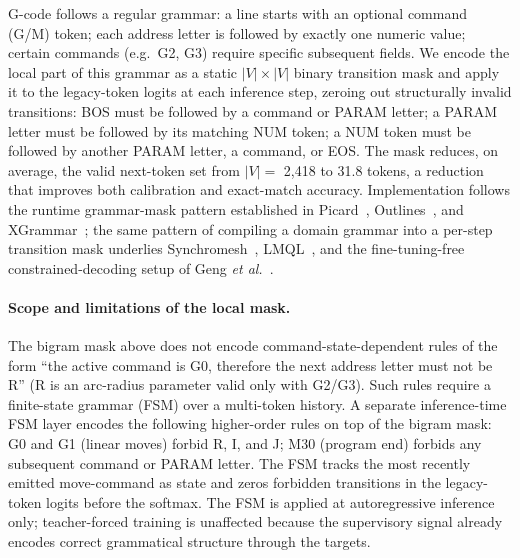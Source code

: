\documentclass[sensors,article,submit,moreauthors,pdftex]{Definitions/mdpi}
\newcommand{\etal}{\textit{et al.}}
\begin{document}
G-code follows a regular grammar: a line starts with an optional command (G/M) token; each address letter is followed by exactly one numeric value; certain commands (e.g.\ G2, G3) require specific subsequent fields. We encode the local part of this grammar as a static $|V| \times |V|$ binary transition mask and apply it to the legacy-token logits at each inference step, zeroing out structurally invalid transitions: BOS must be followed by a command or PARAM letter; a PARAM letter must be followed by its matching NUM token; a NUM token must be followed by another PARAM letter, a command, or EOS. The mask reduces, on average, the valid next-token set from $|V|=$ 2{,}418 to 31.8 tokens, a reduction that improves both calibration and exact-match accuracy. Implementation follows the runtime grammar-mask pattern established in Picard~\cite{picard}, Outlines~\cite{outlines}, and XGrammar~\cite{xgrammar}; the same pattern of compiling a domain grammar into a per-step transition mask underlies Synchromesh~\cite{synchromesh}, LMQL~\cite{lmql}, and the fine-tuning-free constrained-decoding setup of Geng \etal~\cite{geng2023gcd}.

\paragraph{Scope and limitations of the local mask.} The bigram mask above does not encode command-state-dependent rules of the form ``the active command is G0, therefore the next address letter must not be R'' (R is an arc-radius parameter valid only with G2/G3). Such rules require a finite-state grammar (FSM) over a multi-token history. A separate inference-time FSM layer encodes the following higher-order rules on top of the bigram mask: G0 and G1 (linear moves) forbid R, I, and J; M30 (program end) forbids any subsequent command or PARAM letter. The FSM tracks the most recently emitted move-command as state and zeros forbidden transitions in the legacy-token logits before the softmax. The FSM is applied at autoregressive inference only; teacher-forced training is unaffected because the supervisory signal already encodes correct grammatical structure through the targets.
\end{document}
